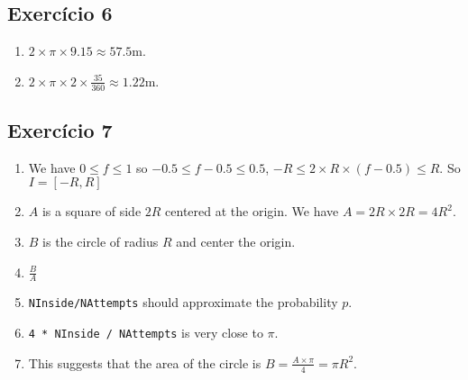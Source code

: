 \subsection{Exercício 6}

\begin{enumerate}
\item $2 \times \pi \times 9.15 \approx 57.5$m.
\item $2 \times \pi \times 2 \times \frac{35}{360} \approx 1.22$m.
\end{enumerate}

\subsection*{Exercício 7}

\begin{enumerate}

\item We have $0 \leq f \leq 1$ so $-0.5 \leq f - 0.5 \leq 0.5$,
  $-R \leq 2 \times R \times \left(f - 0.5 \right) \leq R$. So
  $I = {[-R, R]}$

\item $A$ is a square of side $2R$ centered at the origin.
  We have $A = {2R} \times {2R} = 4R^2$.

\item $B$ is the circle of radius $R$ and center the origin.

\item $\frac{B}{A}$

\item {\tt NInside/NAttempts} should approximate the probability $p$.

\item {\tt 4 * NInside / NAttempts} is very close to $\pi$.

\item This suggests that the area of the circle is
  $B = \frac{A \times \pi}{4} = \pi R^2$.

\end{enumerate}
